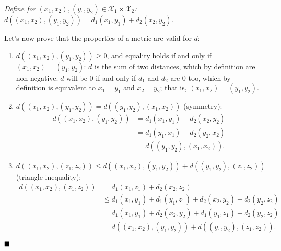 \textit{Define for $(x_1, x_2), (y_1, y_2) \in \mathcal{X}_1\times\mathcal{X}_2$: $d((x_1, x_2), (y_1, y_2)) = d_1(x_1, y_1) + d_2(x_2, y_2)$.}

Let's now prove that the properties of a metric are valid for $d$:

\begin{enumerate}[label=\alph*)]
	\item $d((x_1, x_2), (y_1, y_2))\geq0$, and equality holds if and only if $(x_1, x_2) = (y_1, y_2)$: $d$ is the sum of two distances, which by definition are non-negative. $d$ will be $0$ if and only if $d_1$ and $d_2$ are $0$ too, which by definition is equivalent to $x_1 = y_1$ and $x_2 = y_2$; that is, $(x_1, x_2) = (y_1, y_2)$.
	
	\item $d((x_1, x_2), (y_1, y_2)) = d((y_1, y_2), (x_1, x_2))$ (symmetry):
	\begin{align*}
		d((x_1, x_2), (y_1, y_2)) &= d_1(x_1, y_1) + d_2(x_2, y_2) \\
		&= d_1(y_1, x_1) + d_2(y_2, x_2) \\
		&= d((y_1, y_2), (x_1, x_2)).
	\end{align*}

	\item $d((x_1, x_2), (z_1, z_2)) \leq d((x_1, x_2), (y_1, y_2)) + d((y_1, y_2), (z_1, z_2))$ (triangle inequality):
	\begin{align*}
		d((x_1, x_2), (z_1, z_2)) &= d_1(x_1, z_1) + d_2(x_2, z_2) \\
		&\leq d_1(x_1, y_1) + d_1(y_1, z_1) + d_2(x_2, y_2) + d_2(y_2, z_2) \\
		&= d_1(x_1, y_1) + d_2(x_2, y_2) + d_1(y_1, z_1) + d_2(y_2, z_2) \\
		&= d((x_1, x_2), (y_1, y_2)) + d((y_1, y_2), (z_1, z_2)).
	\end{align*}
\end{enumerate}

$\qed$
